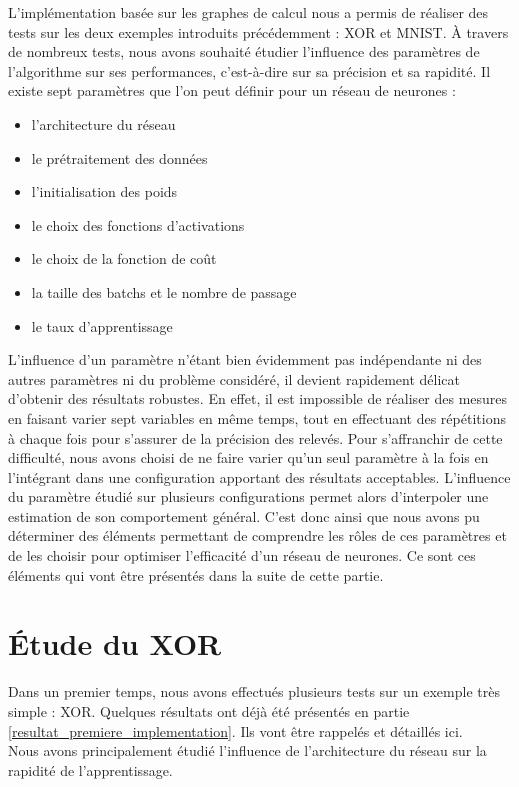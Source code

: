 \documentclass{report}
\theoremstyle{plain}
\theoremstyle{definition}
\theoremstyle{remark}
\begin{document}
L'implémentation basée sur les graphes de calcul nous a permis de réaliser des tests sur les deux exemples introduits précédemment : XOR et MNIST. \`A travers de nombreux tests, nous avons souhaité étudier l'influence des paramètres de l'algorithme sur ses performances, c'est-à-dire sur sa précision et sa rapidité.
\medbreak
Il existe sept paramètres que l'on peut définir pour un réseau de neurones :
\begin{itemize}
\item l'architecture du réseau
\item le prétraitement des données
\item l'initialisation des poids
\item le choix des fonctions d'activations
\item le choix de la fonction de coût
\item la taille des batchs et le nombre de passage
\item le taux d'apprentissage
\end{itemize}
\medbreak
L'influence d'un paramètre n'étant bien évidemment pas indépendante ni des autres paramètres ni du problème considéré, il devient rapidement délicat d'obtenir des résultats robustes. En effet, il est impossible de réaliser des mesures en faisant varier sept variables en même temps, tout en effectuant des répétitions à chaque fois pour s'assurer de la précision des relevés. Pour s'affranchir de cette difficulté, nous avons choisi de ne faire varier qu'un seul paramètre à la fois en l'intégrant dans une configuration apportant des résultats acceptables. L'influence du paramètre étudié sur plusieurs configurations permet alors d'interpoler une estimation de son comportement général.
C'est donc ainsi que nous avons pu déterminer des éléments permettant de comprendre les rôles de ces paramètres et de les choisir pour optimiser l'efficacité d'un réseau de neurones. Ce sont ces éléments qui vont être présentés dans la suite de cette partie.

\section{\'Etude du XOR}

Dans un premier temps, nous avons effectués plusieurs tests sur un exemple très simple : XOR.
Quelques résultats ont déjà été présentés en partie \ref{resultat_premiere_implementation}. Ils vont être rappelés et détaillés ici.\\

Nous avons principalement étudié l'influence de l'architecture du réseau sur la rapidité de l'apprentissage. \\
\end{document}
